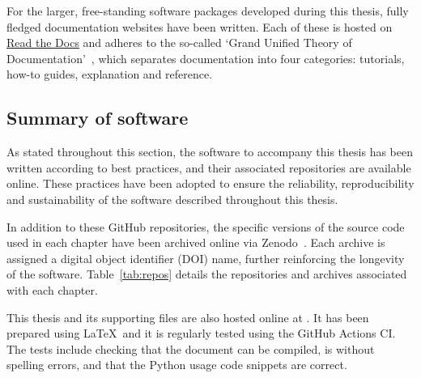 For the larger, free-standing software packages developed during this thesis,
fully fledged documentation websites have been written. Each of these is hosted
on \href{https://readthedocs.org/}{Read the Docs} and adheres to the so-called
`Grand Unified Theory of Documentation'~\cite{documentation}, which separates
documentation into four categories: tutorials, how-to guides, explanation and
reference.

\subsection{Summary of software}

As stated throughout this section, the software to accompany this thesis has
been written according to best practices, and their associated repositories are
available online. These practices have been adopted to ensure the reliability,
reproducibility and sustainability of the software described throughout this
thesis.

In addition to these GitHub repositories, the specific versions of the source
code used in each chapter have been archived online via Zenodo~\cite{zenodo}.
Each archive is assigned a digital object identifier (DOI) name, further
reinforcing the longevity of the software. Table~\ref{tab:repos} details the
repositories and archives associated with each chapter.

\begin{table}[tbhp]
    \centering%
    \resizebox{\textwidth}{!}{%
    }\caption{%
        A summary of the repositories and archives associated with the chapters
        of this thesis%
    }\label{tab:repos}
\end{table}

This thesis and its supporting files are also hosted online at
. It has been prepared using \LaTeX\ and it is
regularly tested using the GitHub Actions CI. The tests include checking that
the document can be compiled, is without spelling errors, and that the Python
usage code snippets are correct.
